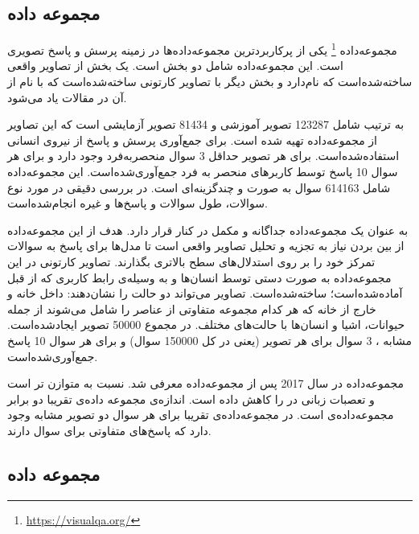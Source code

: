 \subsection{مجموعه داده  \cite{antol2015vqa} \cite{goyal2017making}}

مجموعه‌داده
 \footnote{\href{https://visualqa.org/}{https://visualqa.org/}}
یکی از پرکاربردترین مجموعه‌داده‌ها در زمینه پرسش و پاسخ تصویری است. این مجموعه‌داده شامل دو بخش است. یک بخش از تصاویر واقعی ساخته‌شده‌است که
 نام‌دارد و بخش دیگر با تصاویر کارتونی ساخته‌شده‌است که با نام 
 از آن در مقالات یاد می‌شود.
 
 به ترتیب شامل 123287 تصویر آموزشی و 81434 تصویر آزمایشی است که این تصاویر از مجموعه‌داده
 \cite{lin2014microsoft}
  تهیه شده است.  برای جمع‌آوری پرسش و پاسخ از نیروی انسانی استفاده‌شده‌است. برای هر تصویر حداقل 3 سوال منحصربه‌فرد وجود دارد و برای هر سوال 10 پاسخ توسط کاربرهای منحصر به فرد جمع‌آوری‌شده‌است. این مجموعه‌داده شامل 614163 سوال به صورت 
  و چندگزینه‌ای است. در 
  \cite{antol2015vqa}
  بررسی دقیقی در مورد نوع سوالات، طول سوالات و پاسخ‌ها و غیره انجام‌شده‌است.
  
  
 به عنوان یک مجموعه‌داده جداگانه و مکمل در کنار
 قرار دارد. هدف از این مجموعه‌داده از بین بردن نیاز به تجزیه و تحلیل تصاویر واقعی است تا مدل‌ها برای پاسخ به سوالات تمرکز خود را بر روی استدلال‌های سطح بالاتری بگذارند. تصاویر کارتونی در این مجموعه‌داده به صورت دستی توسط انسان‌ها و به وسیله‌ی رابط کاربری که از قبل آماده‌شده‌است؛ ساخته‌شده‌است. تصاویر می‌تواند دو حالت را نشان‌دهند: داخل خانه و خارج از خانه که هر کدام مجموعه متفاوتی از عناصر را شامل می‌شوند از جمله حیوانات، اشیا و انسان‌ها با حالت‌های مختلف. در مجموع 50000 تصویر ایجاد‌شده‌است. مشابه 
 ، 3 سوال برای هر تصویر (یعنی در کل 150000 سوال) و برای هر سوال 10 پاسخ  جمع‌آوری‌شده‌است.
 
 مجموعه‌داده 
در سال 2017 پس از مجموعه‌داده 
معرفی شد. 
نسبت به 
متوازن تر است و تعصبات زبانی در 
را کاهش داده است. اندازه‌ی مجموعه داده‌ی
تقریبا دو برابر مجموعه‌داده‌ی 
است. در مجموعه‌داده‌ی
تقریبا برای هر سوال دو تصویر مشابه وجود دارد که پاسخ‌های متفاوتی برای سوال دارند.


\subsection{مجموعه داده  \cite{yu2015visual}}

